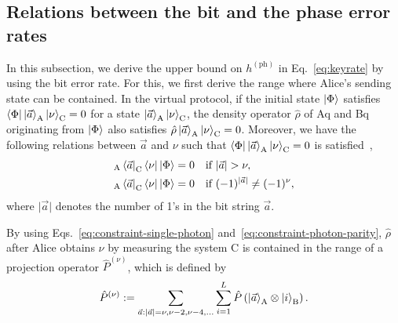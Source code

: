 \documentclass[twocolumn,superscriptaddress,pra,footinbib,notitlepage]{revtex4-1}
\newcommand{\1}{\mbox{1}\hspace{-0.25em}\mbox{l}}
\newcommand{\abs}[1]{\lvert#1\rvert}
\begin{document}
\subsection{Relations between the bit and the phase error rates}
\label{subsec:relation-bit-phase-errors}
In this subsection, we derive the upper bound on $h^{(\textrm{ph})}$ in Eq.~\eqref{eq:keyrate} by using the bit error rate.
For this, we first derive the range where Alice's sending state can be contained.
In the virtual protocol, if the initial state $\ket{\Phi}$ satisfies $\bra{\Phi}\ket{\vec{a}}_\textrm{A}\ket{\nu}_\textrm{C}=0$ for a state $\ket{\vec{a}}_\textrm{A}\ket{\nu}_\textrm{C}$, the density operator $\hat{\rho}$ of Aq and Bq originating from $\ket{\Phi}$ also satisfies $\hat{\rho}\ket{\vec{a}}_\textrm{A}\ket{\nu}_\textrm{C}=0$.
Moreover, we have the following relations between $\vec{a}$ and $\nu$ such that $\bra{\Phi}\ket{\vec{a}}_\textrm{A}\ket{\nu}_\textrm{C}=0$ is satisfied~\cite{tamaki2012unconditional},
\begin{align}
{}_\textrm{A}\bra{\vec{a}}_\textrm{C}\bra{\nu}\ket{\Phi}&=0~~~\textrm{if }\abs{\vec{a}}>\nu,\label{eq:constraint-single-photon}\\
{}_\textrm{A}\bra{\vec{a}}_\textrm{C}\bra{\nu}\ket{\Phi}&=0~~~\textrm{if }(-1)^{\abs{\vec{a}}}\neq(-1)^\nu,\label{eq:constraint-photon-parity}
\end{align}
where $\abs{\vec{a}}$ denotes the number of 1's in the bit string $\vec{a}$.
\begin{comment}
In order to derive these equations, we rewrite $\ket{\Phi}$ in Eq.~\eqref{defi:alice_prepare_state_phase_randomized} as
\begin{align}
\ket{\Phi}=2^{-L}\sum_{\vec{a}}\ket{\vec{a}}_\textrm{A}\sum_{\nu=0}^\infty\ket{\nu}_\textrm{C}\hat{\pi}_\nu\bigotimes_{i=1}^L\left(\ket{\alpha}_i+(-1)^{a_i}\ket{-\alpha}_i\right),
\end{align}
and use the fact that there are always odd number of photons in $\ket{\alpha}-\ket{-\alpha}$ while there are even number of photons in $\ket{\alpha}+\ket{-\alpha}$.
\end{comment}
By using Eqs.~\eqref{eq:constraint-single-photon} and~\eqref{eq:constraint-photon-parity}, $\hat{\rho}$ after Alice obtains $\nu$ by measuring the system C is contained in the range of a projection operator $\hat{P}^{(\nu)}$, which is defined by
\begin{align}
\hat{P}^{(\nu)}:=\sum_{\vec{a}: \abs{\vec{a}}=\nu, \nu-2, \nu-4, \dots}\sum_{i=1}^L\hat{P}\left(\ket{\vec{a}}_\textrm{A}\otimes\ket{i}_\textrm{B}\right).
\end{align}
\end{document}
